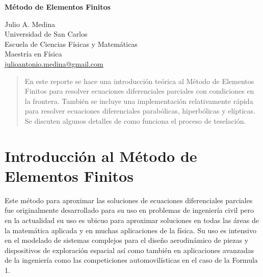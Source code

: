 \documentclass[a4paper]{article}
\begin{document}

\Large
 \begin{center}
\textbf{Método de Elementos Finitos}\\


\hspace{10pt}

\large
Julio A. Medina\\
\hspace{10pt}
\small  
Universidad de San Carlos\\
Escuela de Ciencias Físicas y Matemáticas\\
Maestría en Física\\
\href{mailto:julioantonio.medina@gmail.com}{julioantonio.medina@gmail.com}\\

\end{center}

\hspace{10pt}

\normalsize
\begin{abstract}
En este reporte se hace una introducción teórica al Método de Elementos Finitos para resolver ecuaciones diferenciales parciales con condiciones en la frontera. También se incluye una implementación relativamente rápida para resolver ecuaciones diferenciales parabólicas, hiperbólicas y elípticas. Se discuten algunos detalles de como funciona el proceso de teselación. 
\end{abstract}
\section{Introducción al Método de Elementos Finitos}
Este método para aproximar las soluciones de ecuaciones diferenciales parciales fue originalmente desarrollado para su uso en problemas de ingeniería civil pero en la actualidad su uso es ubicuo para aproximar soluciones en todas las áreas de la matemática aplicada y en muchas aplicaciones de la física. Su uso es intensivo en el modelado de sistemas complejos para el diseño aerodinámico de piezas y dispositivos de exploración espacial así como también en aplicaciones avanzadas de la ingeniería como las competiciones automovilísticas en el caso de la Formula 1. \\ 
\end{document}
